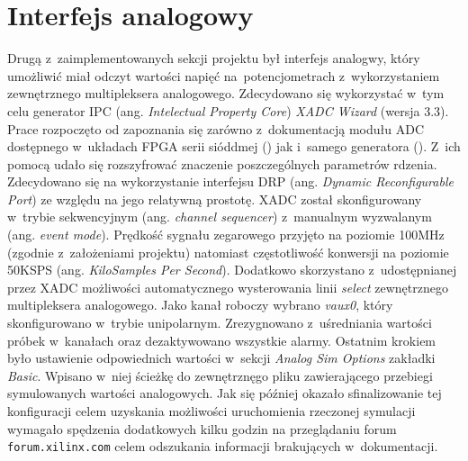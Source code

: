 \section{Interfejs analogowy}

Drugą z~zaimplementowanych sekcji projektu był interfejs analogwy, który umożliwić miał odczyt wartości napięć na~potencjometrach z~wykorzystaniem zewnętrznego multipleksera analogowego. Zdecydowano się wykorzystać w~tym celu generator IPC (ang. \textit{Intelectual Property Core}) \textit{XADC Wizard} (wersja 3.3). Prace rozpoczęto od zapoznania się zarówno z~dokumentacją modułu ADC dostępnego w~układach FPGA serii sióddmej (\cite{xilinx_adc_series_seven}) jak i~samego generatora (\cite{xilinx_xadc_wizard}). Z~ich pomocą udało się rozszyfrować znaczenie poszczególnych parametrów rdzenia. Zdecydowano się na wykorzystanie interfejsu DRP (ang. \textit{Dynamic Reconfigurable Port}) ze względu na jego relatywną prostotę. XADC został skonfigurowany w~trybie sekwencyjnym (ang. \textit{channel sequencer}) z~manualnym wyzwalanym (ang. \textit{event mode}). Prędkość sygnału zegarowego przyjęto na poziomie 100MHz (zgodnie z~założeniami projektu) natomiast częstotliwość konwersji na poziomie 50KSPS (ang. \textit{KiloSamples Per Second}). Dodatkowo skorzystano z~udostępnianej przez XADC możliwości automatycznego wysterowania linii \textit{select} zewnętrznego multipleksera analogowego. Jako kanał roboczy wybrano \textit{vaux0}, który skonfigurowano w~trybie unipolarnym. Zrezygnowano z~uśredniania wartości próbek w~kanałach oraz dezaktywowano wszystkie alarmy. Ostatnim krokiem było ustawienie odpowiednich wartości w~sekcji \textit{Analog Sim Options} zakładki \textit{Basic}. Wpisano w~niej ścieżkę do zewnętrznęgo pliku zawierającego przebiegi symulowanych wartości analogowych. Jak się później okazało sfinalizowanie tej konfiguracji celem uzyskania możliwości uruchomienia rzeczonej symulacji wymagało spędzenia dodatkowych kilku godzin na przeglądaniu forum \verb|forum.xilinx.com| celem odszukania informacji brakujących w~dokumentacji.

